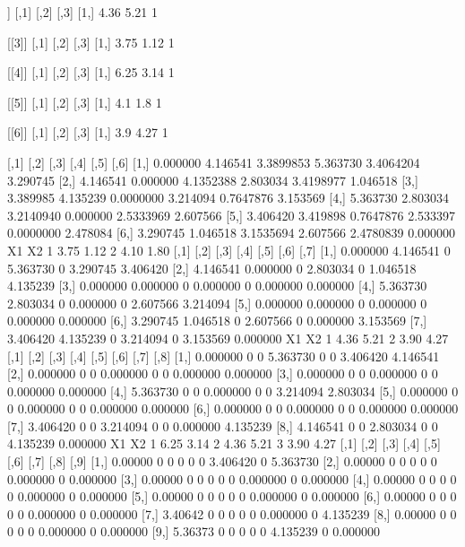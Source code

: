 \documentclass[parskip=full]{scrartcl}
\begin{document}
\begin{enumerate}
\begin{Schunk}
\begin{Soutput}
[[2]]
     [,1] [,2] [,3]
[1,] 4.36 5.21    1

[[3]]
     [,1] [,2] [,3]
[1,] 3.75 1.12    1

[[4]]
     [,1] [,2] [,3]
[1,] 6.25 3.14    1

[[5]]
     [,1] [,2] [,3]
[1,]  4.1  1.8    1

[[6]]
     [,1] [,2] [,3]
[1,]  3.9 4.27    1

         [,1]     [,2]      [,3]     [,4]      [,5]     [,6]
[1,] 0.000000 4.146541 3.3899853 5.363730 3.4064204 3.290745
[2,] 4.146541 0.000000 4.1352388 2.803034 3.4198977 1.046518
[3,] 3.389985 4.135239 0.0000000 3.214094 0.7647876 3.153569
[4,] 5.363730 2.803034 3.2140940 0.000000 2.5333969 2.607566
[5,] 3.406420 3.419898 0.7647876 2.533397 0.0000000 2.478084
[6,] 3.290745 1.046518 3.1535694 2.607566 2.4780839 0.000000
    X1   X2
1 3.75 1.12
2 4.10 1.80
         [,1]     [,2] [,3]     [,4] [,5]     [,6]     [,7]
[1,] 0.000000 4.146541    0 5.363730    0 3.290745 3.406420
[2,] 4.146541 0.000000    0 2.803034    0 1.046518 4.135239
[3,] 0.000000 0.000000    0 0.000000    0 0.000000 0.000000
[4,] 5.363730 2.803034    0 0.000000    0 2.607566 3.214094
[5,] 0.000000 0.000000    0 0.000000    0 0.000000 0.000000
[6,] 3.290745 1.046518    0 2.607566    0 0.000000 3.153569
[7,] 3.406420 4.135239    0 3.214094    0 3.153569 0.000000
    X1   X2
1 4.36 5.21
2 3.90 4.27
         [,1] [,2] [,3]     [,4] [,5] [,6]     [,7]     [,8]
[1,] 0.000000    0    0 5.363730    0    0 3.406420 4.146541
[2,] 0.000000    0    0 0.000000    0    0 0.000000 0.000000
[3,] 0.000000    0    0 0.000000    0    0 0.000000 0.000000
[4,] 5.363730    0    0 0.000000    0    0 3.214094 2.803034
[5,] 0.000000    0    0 0.000000    0    0 0.000000 0.000000
[6,] 0.000000    0    0 0.000000    0    0 0.000000 0.000000
[7,] 3.406420    0    0 3.214094    0    0 0.000000 4.135239
[8,] 4.146541    0    0 2.803034    0    0 4.135239 0.000000
    X1   X2
1 6.25 3.14
2 4.36 5.21
3 3.90 4.27
         [,1] [,2] [,3] [,4] [,5] [,6]     [,7] [,8]     [,9]
 [1,] 0.00000    0    0    0    0    0 3.406420    0 5.363730
 [2,] 0.00000    0    0    0    0    0 0.000000    0 0.000000
 [3,] 0.00000    0    0    0    0    0 0.000000    0 0.000000
 [4,] 0.00000    0    0    0    0    0 0.000000    0 0.000000
 [5,] 0.00000    0    0    0    0    0 0.000000    0 0.000000
 [6,] 0.00000    0    0    0    0    0 0.000000    0 0.000000
 [7,] 3.40642    0    0    0    0    0 0.000000    0 4.135239
 [8,] 0.00000    0    0    0    0    0 0.000000    0 0.000000
 [9,] 5.36373    0    0    0    0    0 4.135239    0 0.000000

\end{Soutput}
\end{Schunk}
\end{enumerate}
\end{document}
